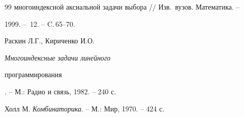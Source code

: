 \begin{thebibliography}{99}
{мно\-гоиндексной аксиальной задачи выбора} // Изв.\ вузов. Математика. --


1999. -- \No\,12. -- C.\,65--70.




Раскин Л.Г., Кириченко И.О. {\it Многоиндексные задачи линейного


программирования}. -- М.: Радио и связь, 1982. -- 240 с.




Холл М. {\it Комбинаторика}. -- М.: Мир, 1970. -- 424 с.





\end{thebibliography}





\vskip 2cm









\smallskip







\label{end}








